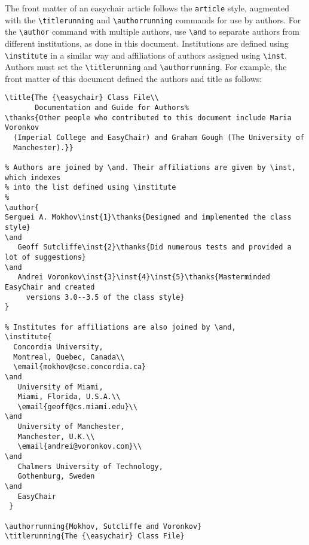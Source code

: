 \documentclass[withtimes]{easychair}
\newcommand{\easychair}{\textsf{easychair}}
\begin{document}
The front matter of an {\easychair} article follows the \texttt{article}
style, augmented with the \verb+\titlerunning+ and \verb+\authorrunning+
commands for use by authors. 
For the \verb+\author+ command with multiple authors, use \verb+\and+ to
separate authors from different institutions, as done in this document.
Institutions are defined using \verb+\institute+ in a similar way and affiliations of authors assigned using \verb+\inst+.
Authors must set the \verb+\titlerunning+ and \verb+\authorrunning+.
For example, the front matter of this document defined the authors
and title as follows:


\noindent\small
\begin{verbatim}
\title{The {\easychair} Class File\\
       Documentation and Guide for Authors%
\thanks{Other people who contributed to this document include Maria Voronkov
  (Imperial College and EasyChair) and Graham Gough (The University of
  Manchester).}}

% Authors are joined by \and. Their affiliations are given by \inst, which indexes
% into the list defined using \institute
%
\author{
Serguei A. Mokhov\inst{1}\thanks{Designed and implemented the class style}
\and
   Geoff Sutcliffe\inst{2}\thanks{Did numerous tests and provided a lot of suggestions}
\and
   Andrei Voronkov\inst{3}\inst{4}\inst{5}\thanks{Masterminded EasyChair and created 
     versions 3.0--3.5 of the class style}
}

% Institutes for affiliations are also joined by \and,
\institute{
  Concordia University,
  Montreal, Quebec, Canada\\
  \email{mokhov@cse.concordia.ca}
\and
   University of Miami,
   Miami, Florida, U.S.A.\\
   \email{geoff@cs.miami.edu}\\
\and
   University of Manchester,
   Manchester, U.K.\\
   \email{andrei@voronkov.com}\\
\and
   Chalmers University of Technology,
   Gothenburg, Sweden
\and
   EasyChair
 }

\authorrunning{Mokhov, Sutcliffe and Voronkov}
\titlerunning{The {\easychair} Class File}
\end{verbatim}
\normalsize

\end{document}
